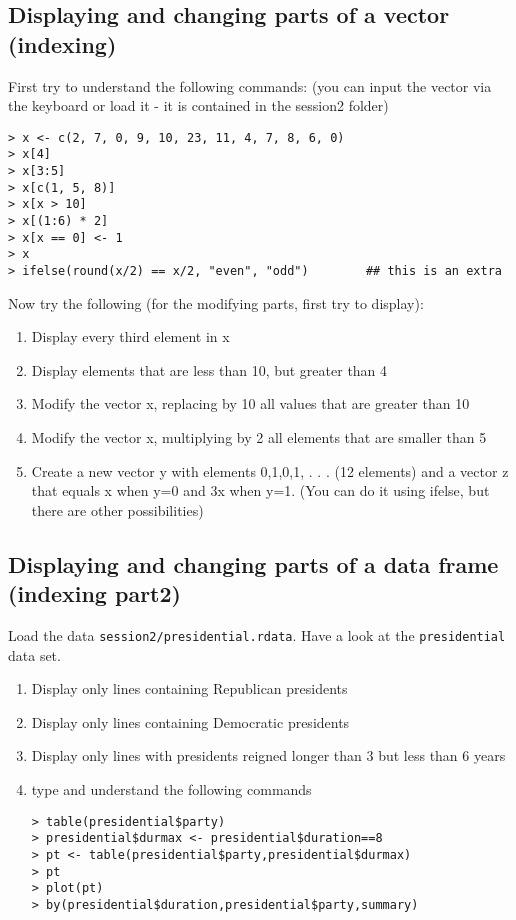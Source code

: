 \documentclass[12pt]{article}
\begin{document}
\subsection{Displaying and changing parts of a vector (indexing)}
First try to understand the following commands: (you can input the vector via the keyboard or load it - it is contained in the session2 folder)
\begin{verbatim}
> x <- c(2, 7, 0, 9, 10, 23, 11, 4, 7, 8, 6, 0)
> x[4]
> x[3:5]
> x[c(1, 5, 8)]
> x[x > 10]
> x[(1:6) * 2]
> x[x == 0] <- 1
> x
> ifelse(round(x/2) == x/2, "even", "odd")        ## this is an extra
\end{verbatim}

Now try the following (for the modifying parts, first try to display):
\begin{enumerate}
\item Display every third element in x
\item Display elements that are less than 10, but greater than 4
\item Modify the vector x, replacing by 10 all values that are greater than 10
\item Modify the vector x, multiplying by 2 all elements that are smaller than 5
\item Create a new vector y with elements 0,1,0,1, . . . (12 elements) and a vector z that equals x when y=0 and 3x when y=1. (You can do it using ifelse, but there are other possibilities)
\end{enumerate}

\subsection{Displaying and changing parts of a data frame (indexing part2)}
Load the data \texttt{session2/presidential.rdata}. Have a look at the \texttt{presidential} data set. 

\begin{enumerate}
\item Display only lines containing Republican presidents
\item Display only lines containing Democratic presidents
\item Display only lines with presidents reigned longer than 3 but less than 6 years
\item type and understand the following commands
\begin{verbatim}
> table(presidential$party)
> presidential$durmax <- presidential$duration==8
> pt <- table(presidential$party,presidential$durmax)
> pt
> plot(pt)
> by(presidential$duration,presidential$party,summary)
\end{verbatim}
\end{enumerate}
\end{document}
